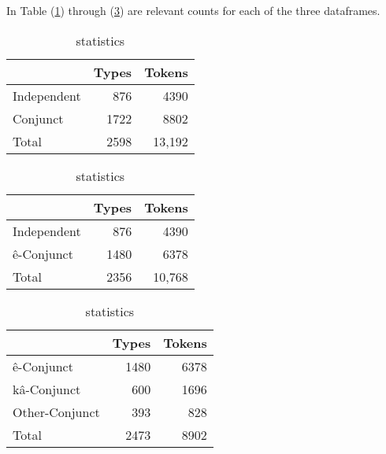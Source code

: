 In Table (\ref{tab:corpstats}) through (\ref{tab:corpstats3}) are relevant counts for each of the three dataframes.

\begin{table}
\centering
\begin{tabular}{lrr} \\
\toprule
               & Types & Tokens \\
\midrule
Independent    &  876  & 4390   \\
Conjunct     & 1722  & 8802   \\
\midrule
Total &  2598  & 13,192   \\
\bottomrule
\end{tabular}
\caption{ statistics \label{tab:corpstats}
}
\end{table}


\begin{table}
\centering
\begin{tabular}{lrr} \\
\toprule
               & Types & Tokens \\
\midrule
Independent    &  876  & 4390   \\
ê-Conjunct     & 1480  & 6378   \\
\midrule
Total &  2356  & 10,768   \\
\bottomrule
\end{tabular}
\caption{ statistics \label{tab:corpstats2}
}
\end{table}


\begin{table}
\centering
\begin{tabular}{lrr} \\
\toprule
               & Types & Tokens \\
\midrule
ê-Conjunct    &  1480  & 6378   \\
kâ-Conjunct     & 600  & 1696   \\
Other-Conjunct     & 393  & 828   \\
\midrule
Total &  2473  & 8902   \\
\bottomrule
\end{tabular}
\caption{ statistics \label{tab:corpstats3}
}
\end{table}


